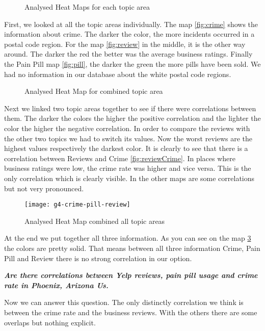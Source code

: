 \begin{figure}[H]
    \centering
        \qquad
    \caption{Analysed Heat Maps for each topic area}
    \label{fig:analysedSeperate}
\end{figure}
First, we looked at all the topic areas individually. The map \ref{fig:crime} shows the information about crime. The darker the color, the more incidents occurred in a postal code region. For the map \ref{fig:review} in the middle, it is the other way around. The darker the red the better was the average business ratings. Finally the Pain Pill map \ref{fig:pill}, the darker the green the more pills have been sold. We had no information in our database about the white postal code regions.
\begin{figure}[H]
    \centering
        \qquad
    \caption{Analysed Heat Map for combined topic area}
    \label{fig:analysedCombinedTwoAreas}
\end{figure}
Next we linked two topic areas together to see if there were correlations between them. The darker the colors the higher the positive correlation and the lighter the color the higher the negative correlation. In order to compare the reviews with the other two topics we had to switch its values. Now the worst reviews are the highest values respectively the darkest color. It is clearly to see that there is a correlation between Reviews and Crime \ref{fig:reviewCrime}. In places where business ratings were low, the crime rate was higher and vice versa. This is the only correlation which is clearly visible. In the other maps are some correlations but not very pronounced.
\begin{figure}[H]
    \centering
    \texttt{[image: g4-crime-pill-review]}
    \caption{Analysed Heat Map combined all topic areas}
    \label{fig:crimePillReview}
\end{figure}
At the end we put together all three information. As you can see on the map \ref{fig:crimePillReview} the colors are pretty solid. That means between all three information Crime, Pain Pill and Review there is no strong correlation in our option.
\begin{center}
    \textbf{\emph{Are there correlations between Yelp reviews, pain pill usage and crime rate in Phoenix, Arizona Us.}}
\end{center}
Now we can answer this question. The only distinctly correlation we think is between the crime rate and the business reviews. With the others there are some overlaps but nothing explicit.
